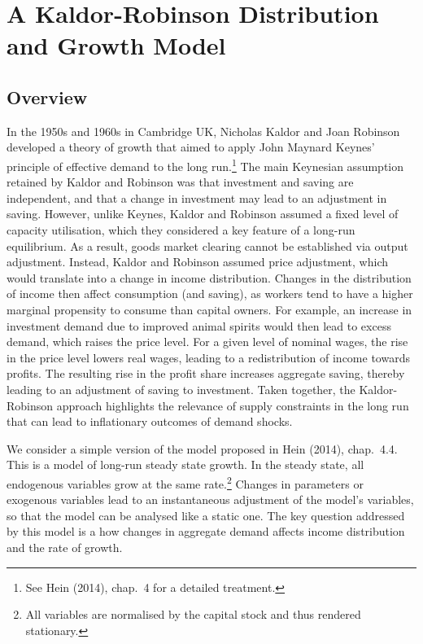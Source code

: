 \documentclass[
  letterpaper,
  DIV=11,
  numbers=noendperiod]{scrreprt}
\begin{document}

\chapter{A Kaldor-Robinson Distribution and Growth
Model}\label{a-kaldor-robinson-distribution-and-growth-model}

\section{Overview}\label{overview-4}

In the 1950s and 1960s in Cambridge UK, Nicholas Kaldor and Joan
Robinson developed a theory of growth that aimed to apply John Maynard
Keynes' principle of effective demand to the long run.\footnote{See Hein
  (2014), chap.~4 for a detailed treatment.} The main Keynesian
assumption retained by Kaldor and Robinson was that investment and
saving are independent, and that a change in investment may lead to an
adjustment in saving. However, unlike Keynes, Kaldor and Robinson
assumed a fixed level of capacity utilisation, which they considered a
key feature of a long-run equilibrium. As a result, goods market
clearing cannot be established via output adjustment. Instead, Kaldor
and Robinson assumed price adjustment, which would translate into a
change in income distribution. Changes in the distribution of income
then affect consumption (and saving), as workers tend to have a higher
marginal propensity to consume than capital owners. For example, an
increase in investment demand due to improved animal spirits would then
lead to excess demand, which raises the price level. For a given level
of nominal wages, the rise in the price level lowers real wages, leading
to a redistribution of income towards profits. The resulting rise in the
profit share increases aggregate saving, thereby leading to an
adjustment of saving to investment. Taken together, the Kaldor-Robinson
approach highlights the relevance of supply constraints in the long run
that can lead to inflationary outcomes of demand shocks.

We consider a simple version of the model proposed in Hein (2014),
chap.~4.4. This is a model of long-run steady state growth. In the
steady state, all endogenous variables grow at the same rate.\footnote{All
  variables are normalised by the capital stock and thus rendered
  stationary.} Changes in parameters or exogenous variables lead to an
instantaneous adjustment of the model's variables, so that the model can
be analysed like a static one. The key question addressed by this model
is a how changes in aggregate demand affects income distribution and the
rate of growth.
\end{document}
